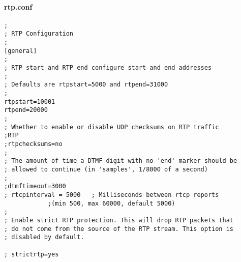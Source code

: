 \documentclass[a4paper,12pt]{report}
\newenvironment{myscriptlisting}
{\begin{list}{}{\setlength{\leftmargin}{1em}}\item\scriptsize\bfseries}
{\end{list}}
\begin{document}
\paragraph{rtp.conf}
\begin{myscriptlisting}
\begin{verbatim}
;
; RTP Configuration
;
[general]
;
; RTP start and RTP end configure start and end addresses
;
; Defaults are rtpstart=5000 and rtpend=31000
;
rtpstart=10001
rtpend=20000
;
; Whether to enable or disable UDP checksums on RTP traffic
;RTP
;rtpchecksums=no
;
; The amount of time a DTMF digit with no 'end' marker should be
; allowed to continue (in 'samples', 1/8000 of a second)
;
;dtmftimeout=3000
; rtcpinterval = 5000 	; Milliseconds between rtcp reports 
			;(min 500, max 60000, default 5000)
;
; Enable strict RTP protection. This will drop RTP packets that
; do not come from the source of the RTP stream. This option is
; disabled by default.

; strictrtp=yes 
\end{verbatim}
\end{myscriptlisting}
\end{document}
